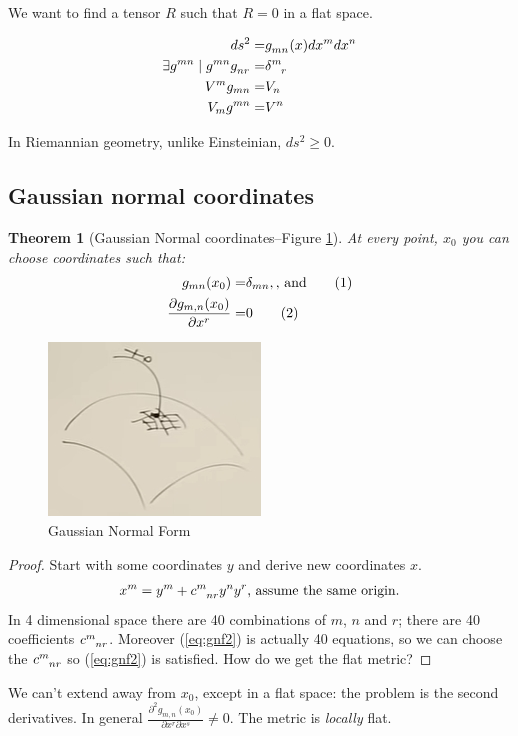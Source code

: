 \documentclass[]{article}
\newcommand\numberthis{\addtocounter{equation}{1}\tag{\theequation}}
\newtheorem{thm}{Theorem}
\begin{document}
We want to find a tensor $R$ such that $R=0$ in a flat space.

\begin{align*}
	ds^2 =& g\indices{_{mn}}(x) dx^m dx^n\\
	\exists  g\indices{^{mn}} \mid  g\indices{^{mn}} g\indices{_{nr}} =& \delta\indices{^m_r}\\
	V^m g_{mn} =& V_n\\
	V_m g^{mn} =& V^n
\end{align*}
 
 In Riemannian geometry, unlike Einsteinian, $ds^2 \ge 0$.
 
 \subsection{Gaussian normal coordinates}
 
 \begin{thm}[Gaussian Normal coordinates--Figure \ref{fig:gr-4-gaussian-normal}]
 	At every point, $x_0$ you can choose coordinates such that:
 	\begin{align*}
 	g_{mn}(x_0)=&\delta_{mn}, \text{, and} \numberthis \label{eq:gnf1}\\
 	\frac{\partial g_{m,n}(x_0)}{\partial x^r}=&0 \numberthis \label{eq:gnf2}
 	\end{align*}
 \end{thm}

\begin{figure}[H]
	\begin{center}
		\caption{Gaussian Normal Form}\label{fig:gr-4-gaussian-normal}
		\includegraphics{gr-4-gaussian-normal}
	\end{center}
\end{figure}

\begin{proof}
	Start with some coordinates $y$ and derive new coordinates $x$.
	\begin{align*}
		x^m = y^m + c\indices{^m_{nr}} y^n y^r \text{, assume the same origin.}
	\end{align*}
	In 4 dimensional space there are 40 combinations of $m$, $n$ and $r$; there are 40 coefficients $c\indices{^m_{nr}}$. Moreover (\ref{eq:gnf2}) is actually 40 equations, so we can choose the $c\indices{^m_{nr}}$ so (\ref{eq:gnf2})  is satisfied.
	How do we get the flat metric?
\end{proof}
We can't extend away from $x_0$, except in a flat space: the problem is the second derivatives. In general $\frac{\partial^2 g_{m,n}(x_0)}{\partial x^r \partial x^s}\ne0$. The metric is \emph{locally} flat.
\end{document}
